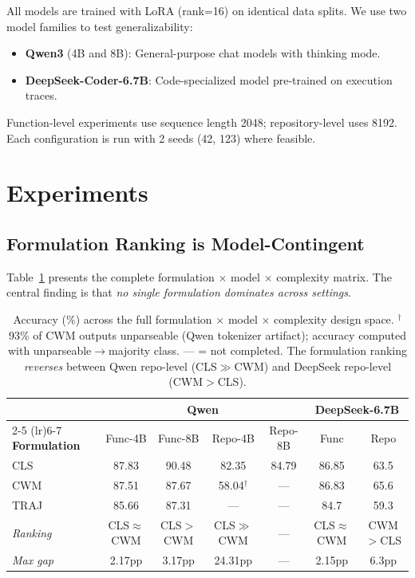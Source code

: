 \documentclass[11pt,a4paper]{article}
\begin{document}
All models are trained with LoRA (rank=16) on identical data splits. We use two model families to test generalizability:
\begin{itemize}
\item \textbf{Qwen3} (4B and 8B): General-purpose chat models with thinking mode.
\item \textbf{DeepSeek-Coder-6.7B}: Code-specialized model pre-trained on execution traces.
\end{itemize}

Function-level experiments use sequence length 2048; repository-level uses 8192. Each configuration is run with 2 seeds (42, 123) where feasible.

\section{Experiments}

\subsection{Formulation Ranking is Model-Contingent}
\label{sec:matrix}

Table~\ref{tab:matrix} presents the complete formulation $\times$ model $\times$ complexity matrix. The central finding is that \emph{no single formulation dominates across settings}.

\begin{table}[t]
\centering
\small
\begin{tabular}{l cccc cc}
\toprule
& \multicolumn{4}{c}{\textbf{Qwen}} & \multicolumn{2}{c}{\textbf{DeepSeek-6.7B}} \\
\cmidrule(lr){2-5} \cmidrule(lr){6-7}
\textbf{Formulation} & Func-4B & Func-8B & Repo-4B & Repo-8B & Func & Repo \\
\midrule
CLS & 87.83 & 90.48 & 82.35 & 84.79 & 86.85 & 63.5 \\
CWM & 87.51 & 87.67 & 58.04$^\dagger$ & --- & 86.83 & 65.6 \\
TRAJ & 85.66 & 87.31 & --- & --- & 84.7 & 59.3 \\
\midrule
\textit{Ranking} & CLS$\approx$CWM & CLS$>$CWM & CLS$\gg$CWM & --- & CLS$\approx$CWM & CWM$>$CLS \\
\textit{Max gap} & 2.17pp & 3.17pp & 24.31pp & --- & 2.15pp & 6.3pp \\
\bottomrule
\end{tabular}
\caption{Accuracy (\%) across the full formulation $\times$ model $\times$ complexity design space. $^\dagger$93\% of CWM outputs unparseable (Qwen tokenizer artifact); accuracy computed with unparseable$\to$majority class. --- = not completed. The formulation ranking \emph{reverses} between Qwen repo-level (CLS$\gg$CWM) and DeepSeek repo-level (CWM$>$CLS).}
\label{tab:matrix}
\end{table}
\end{document}
